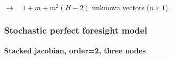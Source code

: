 \documentclass{beamer}
\begin{document}
\begin{frame}[c,fragile]{}

   \bigskip\bigskip

   $\rightarrow\quad 1 + m + m^2(H-2)$ unknown vectors  ($n\times 1$).

\end{frame}


\begin{frame}
   \frametitle{Stochastic perfect foresight model}
   \framesubtitle{Stacked jacobian, order=2, three nodes}
   \begin{center}
      \scalebox{.5}{
         }
   \end{center}

\end{frame}
\end{document}
